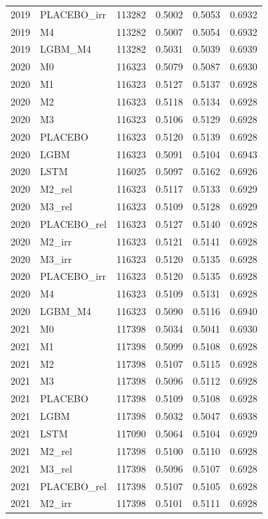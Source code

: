 \begin{tabular}{llrrrr}
2019 & PLACEBO\_irr & 113282 & 0.5002 & 0.5053 & 0.6932 \\
2019 & M4 & 113282 & 0.5007 & 0.5054 & 0.6932 \\
2019 & LGBM\_M4 & 113282 & 0.5031 & 0.5039 & 0.6939 \\
2020 & M0 & 116323 & 0.5079 & 0.5087 & 0.6930 \\
2020 & M1 & 116323 & 0.5127 & 0.5137 & 0.6928 \\
2020 & M2 & 116323 & 0.5118 & 0.5134 & 0.6928 \\
2020 & M3 & 116323 & 0.5106 & 0.5129 & 0.6928 \\
2020 & PLACEBO & 116323 & 0.5120 & 0.5139 & 0.6928 \\
2020 & LGBM & 116323 & 0.5091 & 0.5104 & 0.6943 \\
2020 & LSTM & 116025 & 0.5097 & 0.5162 & 0.6926 \\
2020 & M2\_rel & 116323 & 0.5117 & 0.5133 & 0.6929 \\
2020 & M3\_rel & 116323 & 0.5109 & 0.5128 & 0.6929 \\
2020 & PLACEBO\_rel & 116323 & 0.5127 & 0.5140 & 0.6928 \\
2020 & M2\_irr & 116323 & 0.5121 & 0.5141 & 0.6928 \\
2020 & M3\_irr & 116323 & 0.5120 & 0.5135 & 0.6928 \\
2020 & PLACEBO\_irr & 116323 & 0.5120 & 0.5135 & 0.6928 \\
2020 & M4 & 116323 & 0.5109 & 0.5131 & 0.6928 \\
2020 & LGBM\_M4 & 116323 & 0.5090 & 0.5116 & 0.6940 \\
2021 & M0 & 117398 & 0.5034 & 0.5041 & 0.6930 \\
2021 & M1 & 117398 & 0.5099 & 0.5108 & 0.6928 \\
2021 & M2 & 117398 & 0.5107 & 0.5115 & 0.6928 \\
2021 & M3 & 117398 & 0.5096 & 0.5112 & 0.6928 \\
2021 & PLACEBO & 117398 & 0.5109 & 0.5108 & 0.6928 \\
2021 & LGBM & 117398 & 0.5032 & 0.5047 & 0.6938 \\
2021 & LSTM & 117090 & 0.5064 & 0.5104 & 0.6929 \\
2021 & M2\_rel & 117398 & 0.5100 & 0.5110 & 0.6928 \\
2021 & M3\_rel & 117398 & 0.5096 & 0.5107 & 0.6928 \\
2021 & PLACEBO\_rel & 117398 & 0.5107 & 0.5105 & 0.6928 \\
2021 & M2\_irr & 117398 & 0.5101 & 0.5111 & 0.6928 \\

\end{tabular}
